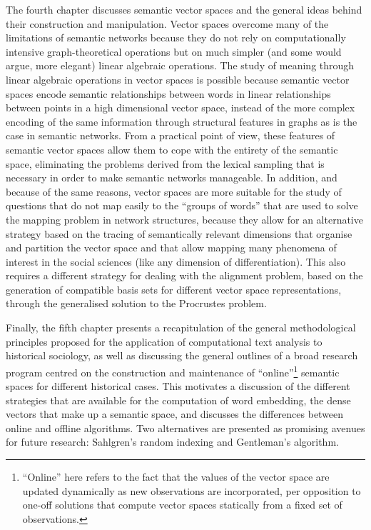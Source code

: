 The fourth chapter discusses semantic vector spaces and the general ideas behind their construction and manipulation.
Vector spaces overcome many of the limitations of semantic networks because they do not rely on computationally intensive graph-theoretical operations but on much simpler (and some would argue, more elegant) linear algebraic operations.
The study of meaning through linear algebraic operations in vector spaces is possible because semantic vector spaces encode semantic relationships between words in linear relationships between points in a high dimensional vector space, instead of the more complex encoding of the same information through structural features in graphs as is the case in semantic networks.
From a practical point of view, these features of semantic vector spaces allow them to cope with the entirety of the semantic space, eliminating the problems derived from the lexical sampling that is necessary in order to make semantic networks manageable.
In addition, and because of the same reasons, vector spaces are more suitable for the study of questions that do not map easily to the ``groups of words'' that are used to solve the mapping problem in network structures, because they allow for an alternative strategy based on the tracing of semantically relevant dimensions that organise and partition the vector space and that allow mapping many phenomena of interest in the social sciences (like any dimension of differentiation).
This also requires a different strategy for dealing with the alignment problem, based on the generation of compatible basis sets for
different vector space representations, through the generalised solution to the Procrustes problem.

Finally, the fifth chapter presents a recapitulation of the general methodological principles proposed for the application of computational text analysis to historical sociology, as well as discussing the general outlines of a broad research program centred on the construction and maintenance of ``online''\footnote{
    \label{foot:online}
    ``Online'' here refers to the fact that the values of the vector space are updated dynamically as new observations are incorporated, per opposition to one-off solutions that compute vector spaces statically from a fixed set of observations.
} semantic spaces for different historical cases.
This motivates a discussion of the different strategies that are available for the computation of word embedding, the dense vectors that make up a semantic space, and discusses the differences between online and offline algorithms.
Two alternatives are presented as promising avenues for future research: Sahlgren's random indexing and Gentleman's algorithm.
